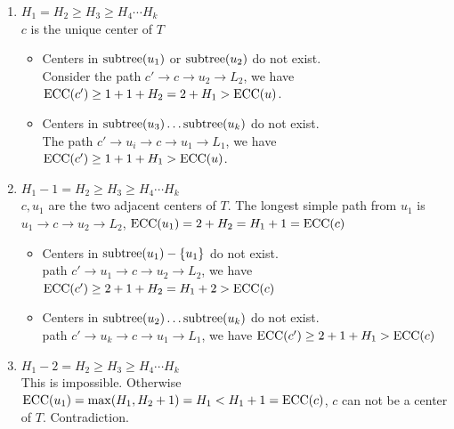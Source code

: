 \documentclass{article}
\begin{document}
\begin{enumerate}
	\item $H_1=H_2\geq H_3\geq H_4\cdots H_k$\\
	      $c$ is the unique center of $T$
	      \begin{itemize}
		      \item Centers in $\mathrm{subtree}(u_1)$ or $\mathrm{subtree}(u_2)$ do not exist.\\
		            Consider the path $c'\to c\to u_2\to L_2$,
		            we have $\mathrm{ECC}(c')\geq 1+1+H_2=2+H_1>\mathrm{ECC}(u)$.
		      \item Centers in $\mathrm{subtree}(u_3)\ldots \mathrm{subtree}(u_k)$  do not exist.\\
		            The path $c'\to u_i\to c\to u_1\to L_1$,
		            we have $\mathrm{ECC}(c')\geq 1+1+H_1> \mathrm{ECC}(u)$.
	      \end{itemize}
	\item $H_1-1=H_2\geq H_3\geq H_4\cdots H_k$\\
	      $c,u_1$ are the two adjacent centers of $T$.
				The longest simple path from $u_1$ is $u_1\to c\to u_2\to L_2$, $\mathrm{ECC}(u_1)=2+H_2=H_1+1=\mathrm{ECC}(c)$
	      \begin{itemize}
		      \item Centers in $\mathrm{subtree}(u_1)-\{u_1\}$ do not exist.\\
		            path $c'\to u_1\to c\to u_2\to L_2$,
								we have $\mathrm{ECC}(c')\geq 2+1+H_2=H_1+2>\mathrm{ECC}(c)$
		      \item Centers in $\mathrm{subtree}(u_2)\ldots \mathrm{subtree}(u_k)$  do not exist.\\
		            path $c'\to u_k\to c\to u_1\to L_1$,
								we have $\mathrm{ECC}(c')\geq 2+1+H_1>\mathrm{ECC}(c)$
	      \end{itemize}
	\item $H_1-2=H_2\geq H_3\geq H_4\cdots H_k$\\
	      This is impossible.
	      Otherwise $\mathrm{ECC}(u_1)=\max(H_1,H_2+1)=H_1<H_1+1 =\mathrm{ECC}(c)$,
	      $c$ can not be a center of $T$.
	      Contradiction.

\end{enumerate}
\end{document}
